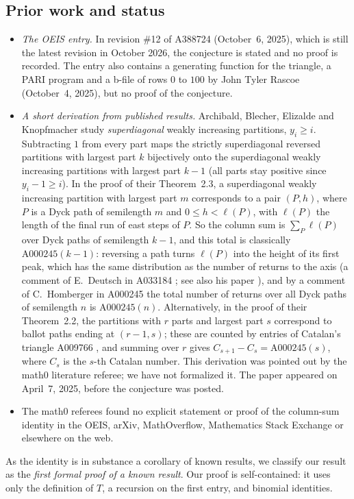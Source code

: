 \documentclass[11pt]{amsart}
\theoremstyle{plain}
\theoremstyle{definition}
\begin{document}
\subsection*{Prior work and status}
\begin{itemize}
\item \emph{The OEIS entry.} In revision \#12 of A388724 (October~6, 2025), which is still the latest revision in October 2026, the conjecture is stated and no proof is recorded. The entry also contains a generating function for the triangle, a PARI program and a b-file of rows $0$ to $100$ by John Tyler Rascoe (October~4, 2025), but no proof of the conjecture.
\item \emph{A short derivation from published results.} Archibald, Blecher, Elizalde and Knopfmacher \cite{ABEK} study \emph{superdiagonal} weakly increasing partitions, $y_i\ge i$. Subtracting $1$ from every part maps the strictly superdiagonal reversed partitions with largest part $k$ bijectively onto the superdiagonal weakly increasing partitions with largest part $k-1$ (all parts stay positive since $y_i-1\ge i$). In the proof of their Theorem~2.3, a superdiagonal weakly increasing partition with largest part $m$ corresponds to a pair $(P,h)$, where $P$ is a Dyck path of semilength $m$ and $0\le h<\ell(P)$, with $\ell(P)$ the length of the final run of east steps of $P$. So the column sum is $\sum_{P}\ell(P)$ over Dyck paths of semilength $k-1$, and this total is classically $\mathrm{A000245}(k-1)$: reversing a path turns $\ell(P)$ into the height of its first peak, which has the same distribution as the number of returns to the axis (a comment of E.~Deutsch in A033184 \cite{A033184}; see also his paper \cite{Deutsch}), and by a comment of C.~Homberger in A000245 \cite{A000245} the total number of returns over all Dyck paths of semilength $n$ is $\mathrm{A000245}(n)$. Alternatively, in the proof of their Theorem~2.2, the partitions with $r$ parts and largest part $s$ correspond to ballot paths ending at $(r-1,s)$; these are counted by entries of Catalan's triangle A009766 \cite{A009766}, and summing over $r$ gives $C_{s+1}-C_s=\mathrm{A000245}(s)$, where $C_s$ is the $s$-th Catalan number. This derivation was pointed out by the math0 literature referee; we have not formalized it. The paper \cite{ABEK} appeared on April~7, 2025, before the conjecture was posted.
\item The math0 referees found no explicit statement or proof of the column-sum identity in the OEIS, arXiv, MathOverflow, Mathematics Stack Exchange or elsewhere on the web.
\end{itemize}
As the identity is in substance a corollary of known results, we classify our result as the \emph{first formal proof of a known result}. Our proof is self-contained: it uses only the definition of $T$, a recursion on the first entry, and binomial identities.
\end{document}
